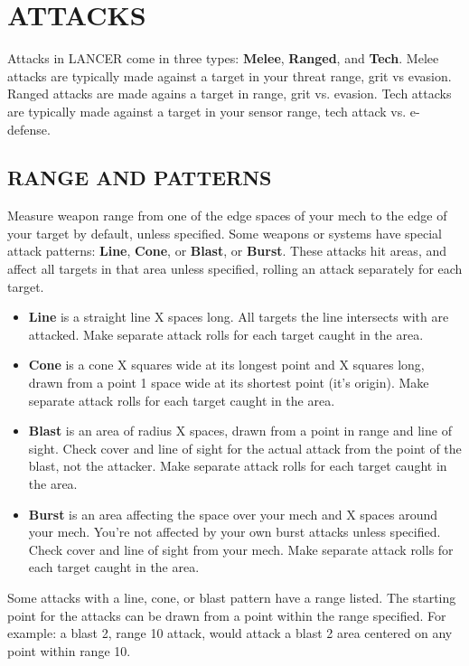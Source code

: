\section{ATTACKS}
Attacks in LANCER come in three types: \textbf{Melee}, \textbf{Ranged}, and \textbf{Tech}. Melee attacks are typically made against a target in your threat range, grit vs evasion. Ranged attacks are made agains a target in range, grit vs. evasion. Tech attacks are typically made against a target in your sensor range, tech attack vs. e-defense. 

\subsection{RANGE AND PATTERNS}
Measure weapon range from one of the edge spaces of your mech to the edge of your target by default, unless specified. 
Some weapons or systems have special attack patterns: \textbf{Line}, \textbf{Cone}, or \textbf{Blast}, or \textbf{Burst}. These attacks hit areas, and affect all targets in that area unless specified, rolling an attack separately for each target.
\begin{itemize}
\item \textbf{Line} is a straight line X spaces long. All targets the line intersects with are attacked. Make separate attack rolls for each target caught in the area.
\item \textbf{Cone} is a cone X squares wide at its longest point and X squares long, drawn from a point 1 space wide at its shortest point (it’s origin). Make separate attack rolls for each target caught in the area.
\item \textbf{Blast} is an area of radius X spaces, drawn from a point in range and line of sight. Check cover and line of sight for the actual attack from the point of the blast, not the attacker. Make separate attack rolls for each target caught in the area.
\item \textbf{Burst} is an area affecting the space over your mech and X spaces around your mech. You’re not affected by your own burst attacks unless specified. Check cover and line of sight from your mech. Make separate attack rolls for each target caught in the area.
\end{itemize}

Some attacks with a line, cone, or blast pattern have a range listed. The starting point for the attacks can be drawn from a point within the range specified. For example: a blast 2, range 10 attack, would attack a blast 2 area centered on any point within range 10.

